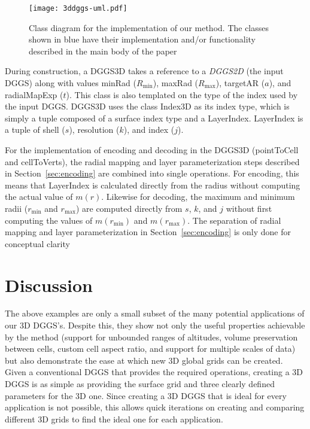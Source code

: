 \begin{figure}[ht!]
	\centering
	\texttt{[image: 3ddggs-uml.pdf]}
	\caption[Title]{
		Class diagram for the implementation of our method. The classes shown in blue have their implementation and/or functionality described in the main body of the paper
	}
	\label{fig:uml}
\end{figure}


During construction, a DGGS3D takes a reference to a \textit{DGGS2D} (the input DGGS) along with values minRad ($R_\mathrm{min}$), maxRad ($R_\mathrm{max}$), targetAR ($a$), and radialMapExp ($t$). This class is also templated on the type of the index used by the input DGGS. DGGS3D uses the class Index3D as its index type, which is simply a tuple composed of a surface index type and a LayerIndex. LayerIndex is a tuple of shell ($s$), resolution ($k$), and index ($j$).

For the implementation of encoding and decoding in the DGGS3D (pointToCell and cellToVerts), the radial mapping and layer parameterization steps described in Section~\ref{sec:encoding} are combined into single operations. For encoding, this means that LayerIndex is calculated directly from the radius without computing the actual value of $m(r)$. Likewise for decoding, the maximum and minimum radii ($r_\mathrm{min}$ and $r_\mathrm{max}$) are computed directly from $s$, $k$, and $j$ without first computing the values of $m(r_\mathrm{min})$ and $m(r_\mathrm{max})$. The separation of radial mapping and layer parameterization in Section~\ref{sec:encoding} is only done for conceptual clarity


\section{Discussion}
The above examples are only a small subset of the many potential applications of our 3D DGGS's.
Despite this, they show not only the useful properties achievable by the method (support for unbounded ranges of altitudes, volume preservation between cells, custom cell aspect ratio, and support for multiple scales of data) but also demonstrate the ease at which new 3D global grids can be created.
Given a conventional DGGS that provides the required operations, creating a 3D DGGS is as simple as providing the surface grid and three clearly defined parameters for the 3D one.
Since creating a 3D DGGS that is ideal for every application is not possible, this allows quick iterations on creating and comparing different 3D grids to find the ideal one for each application.
